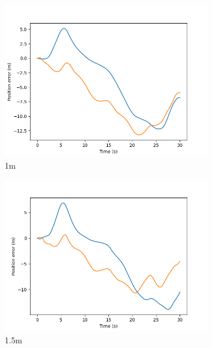 \documentclass[class=article, crop=false]{standalone}
\begin{document}
\begin{figure}
\begin{subfigure}[b]{0.48\textwidth}
        \includegraphics{scenario1/rov-100m/1.0m/rov_position_error_controlled}
        \caption{1m}
        \label{}
    \end{subfigure}
    \hfill
    \begin{subfigure}[b]{0.48\textwidth}
        \centering
        \includegraphics{scenario1/rov-100m/1.5m/rov_position_error_controlled}
        \caption{1.5m}
        \label{}
    \end{subfigure}
    \vfill
    \begin{subfigure}[b]{0.48\textwidth}
        \centering

\end{subfigure}
\end{figure}
\end{document}
